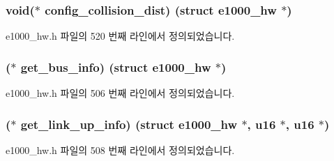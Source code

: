 \subsubsection[{\texorpdfstring{config\+\_\+collision\+\_\+dist}{config_collision_dist}}]{\setlength{\rightskip}{0pt plus 5cm}void($\ast$ config\+\_\+collision\+\_\+dist) (struct {\bf e1000\+\_\+hw} $\ast$)}\hypertarget{structe1000__mac__operations_a4f5d06d390d296c64c69f0db91e87037}{}\label{structe1000__mac__operations_a4f5d06d390d296c64c69f0db91e87037}


e1000\+\_\+hw.\+h 파일의 520 번째 라인에서 정의되었습니다.

\subsubsection[{\texorpdfstring{get\+\_\+bus\+\_\+info}{get_bus_info}}]{($\ast$ get\+\_\+bus\+\_\+info) (struct {\bf e1000\+\_\+hw} $\ast$)}\hypertarget{structe1000__mac__operations_a296d1a785e4fe3f39d43fd16bb067ee4}{}\label{structe1000__mac__operations_a296d1a785e4fe3f39d43fd16bb067ee4}


e1000\+\_\+hw.\+h 파일의 506 번째 라인에서 정의되었습니다.

\subsubsection[{\texorpdfstring{get\+\_\+link\+\_\+up\+\_\+info}{get_link_up_info}}]{($\ast$ get\+\_\+link\+\_\+up\+\_\+info) (struct {\bf e1000\+\_\+hw} $\ast$, {\bf u16} $\ast$, {\bf u16} $\ast$)}\hypertarget{structe1000__mac__operations_ac33be4d35ec01cf9ebc0942a06c6e353}{}\label{structe1000__mac__operations_ac33be4d35ec01cf9ebc0942a06c6e353}


e1000\+\_\+hw.\+h 파일의 508 번째 라인에서 정의되었습니다.

